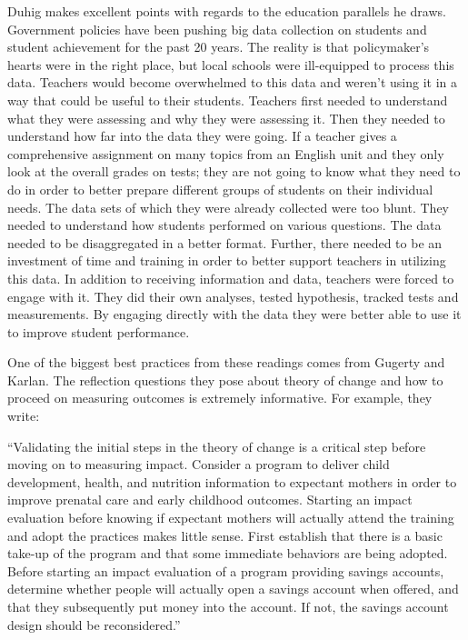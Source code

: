 \documentclass[]{book}
\theoremstyle{definition}
\theoremstyle{definition}
\theoremstyle{definition}
\theoremstyle{remark}
\begin{document}
Duhig makes excellent points with regards to the education parallels he
draws. Government policies have been pushing big data collection on
students and student achievement for the past 20 years. The reality is
that policymaker's hearts were in the right place, but local schools
were ill-equipped to process this data. Teachers would become
overwhelmed to this data and weren't using it in a way that could be
useful to their students. Teachers first needed to understand what they
were assessing and why they were assessing it. Then they needed to
understand how far into the data they were going. If a teacher gives a
comprehensive assignment on many topics from an English unit and they
only look at the overall grades on tests; they are not going to know
what they need to do in order to better prepare different groups of
students on their individual needs. The data sets of which they were
already collected were too blunt. They needed to understand how students
performed on various questions. The data needed to be disaggregated in a
better format. Further, there needed to be an investment of time and
training in order to better support teachers in utilizing this data. In
addition to receiving information and data, teachers were forced to
engage with it. They did their own analyses, tested hypothesis, tracked
tests and measurements. By engaging directly with the data they were
better able to use it to improve student performance.

One of the biggest best practices from these readings comes from Gugerty
and Karlan. The reflection questions they pose about theory of change
and how to proceed on measuring outcomes is extremely informative. For
example, they write:

``Validating the initial steps in the theory of change is a critical
step before moving on to measuring impact. Consider a program to deliver
child development, health, and nutrition information to expectant
mothers in order to improve prenatal care and early childhood outcomes.
Starting an impact evaluation before knowing if expectant mothers will
actually attend the training and adopt the practices makes little sense.
First establish that there is a basic take-up of the program and that
some immediate behaviors are being adopted. Before starting an impact
evaluation of a program providing savings accounts, determine whether
people will actually open a savings account when offered, and that they
subsequently put money into the account. If not, the savings account
design should be reconsidered.''
\end{document}
